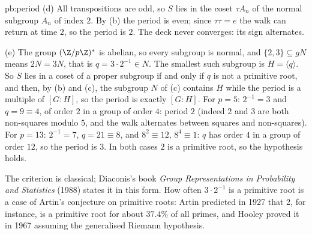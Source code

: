 \begin{solution}{pb:period}
(d) All transpositions are odd, so $S$ lies in the coset $\tau A_n$ of the normal subgroup $A_n$ of index $2$. By (b) the period is even; since $\tau\tau=e$ the walk can
return at time $2$, so the period is $2$. The deck never converges: its sign alternates.

(e) The group $(\Z/p\Z)^*$ is abelian, so every subgroup is normal, and $\{2,3\}\subseteq gN$ means $2N=3N$, that is $q=3\cdot2^{-1}\in N$. The smallest such subgroup is $H=\langle q\rangle$. So
$S$ lies in a coset of a proper subgroup if and only if $q$ is not a primitive root, and then, by (b) and (c), the subgroup $N$ of (c) contains $H$
while the period is a multiple of $[G:H]$, so the period is exactly $[G:H]$. For $p=5$: $2^{-1}=3$ and $q=9\equiv4$, of order $2$ in a group of order $4$: period $2$
(indeed $2$ and $3$ are both non-squares modulo $5$, and the walk alternates between squares and non-squares). For $p=13$: $2^{-1}=7$, $q=21\equiv8$, and
$8^2\equiv12$, $8^4\equiv1$: $q$ has order $4$ in a group of order $12$, so the period is $3$. In both cases $2$ is a primitive root, so the hypothesis holds.

\leads The criterion is classical; Diaconis's book \emph{Group Representations in Probability and Statistics} (1988) states it in this form. How often
$3\cdot2^{-1}$ is a primitive root is a case of Artin's conjecture on primitive roots: Artin predicted in 1927 that $2$, for instance, is a
primitive root for about $37.4\%$ of all primes, and Hooley proved it in 1967 assuming the generalised Riemann hypothesis.
\end{solution}

